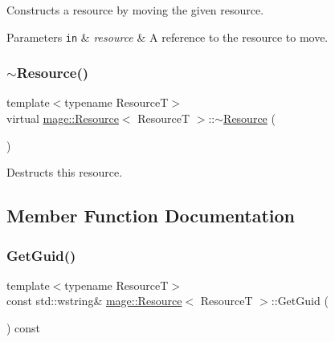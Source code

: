 Constructs a resource by moving the given resource.


\begin{DoxyParams}[1]{Parameters}
\mbox{\tt in}  & {\em resource} & A reference to the resource to move. \\
\hline
\end{DoxyParams}
\mbox{\label{classmage_1_1_resource_a56a3ac799224e100b271b65ec455b59e}} 
\subsubsection{\texorpdfstring{$\sim$\+Resource()}{~Resource()}}
{\footnotesize\ttfamily template$<$typename ResourceT$>$ \\
virtual \mbox{\hyperlink{classmage_1_1_resource}{mage\+::\+Resource}}$<$ ResourceT $>$\+::$\sim$\mbox{\hyperlink{classmage_1_1_resource}{Resource}} (\begin{DoxyParamCaption}{ }\end{DoxyParamCaption})\hspace{0.3cm}{\ttfamily [virtual]}}

Destructs this resource. 

\subsection{Member Function Documentation}
\mbox{\label{classmage_1_1_resource_a6b954ea75373227ce82b5a59d51aaa9d}} 
\subsubsection{\texorpdfstring{Get\+Guid()}{GetGuid()}}
{\footnotesize\ttfamily template$<$typename ResourceT$>$ \\
const std\+::wstring\& \mbox{\hyperlink{classmage_1_1_resource}{mage\+::\+Resource}}$<$ ResourceT $>$\+::Get\+Guid (\begin{DoxyParamCaption}{ }\end{DoxyParamCaption}) const\hspace{0.3cm}{\ttfamily [noexcept]}}

